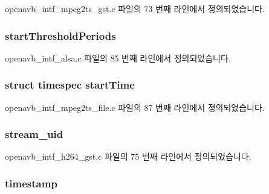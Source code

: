 openavb\+\_\+intf\+\_\+mpeg2ts\+\_\+gst.\+c 파일의 73 번째 라인에서 정의되었습니다.

\subsubsection[{\texorpdfstring{start\+Threshold\+Periods}{startThresholdPeriods}}]{ start\+Threshold\+Periods}\hypertarget{structpvt__data__t_a3655c38e7d48f6551138d29f0651fd9d}{}\label{structpvt__data__t_a3655c38e7d48f6551138d29f0651fd9d}


openavb\+\_\+intf\+\_\+alsa.\+c 파일의 85 번째 라인에서 정의되었습니다.

\subsubsection[{\texorpdfstring{start\+Time}{startTime}}]{\setlength{\rightskip}{0pt plus 5cm}struct timespec start\+Time}\hypertarget{structpvt__data__t_ae2cc326427cdc63f9673b87edb83036c}{}\label{structpvt__data__t_ae2cc326427cdc63f9673b87edb83036c}


openavb\+\_\+intf\+\_\+mpeg2ts\+\_\+file.\+c 파일의 87 번째 라인에서 정의되었습니다.

\subsubsection[{\texorpdfstring{stream\+\_\+uid}{stream_uid}}]{ stream\+\_\+uid}\hypertarget{structpvt__data__t_a511b2a26fe61b945ced1dd0bab9f2d1b}{}\label{structpvt__data__t_a511b2a26fe61b945ced1dd0bab9f2d1b}


openavb\+\_\+intf\+\_\+h264\+\_\+gst.\+c 파일의 75 번째 라인에서 정의되었습니다.

\subsubsection[{\texorpdfstring{timestamp}{timestamp}}]{ timestamp}\hypertarget{structpvt__data__t_a789796b7042ad0c179aca7d160c8def8}{}\label{structpvt__data__t_a789796b7042ad0c179aca7d160c8def8}


